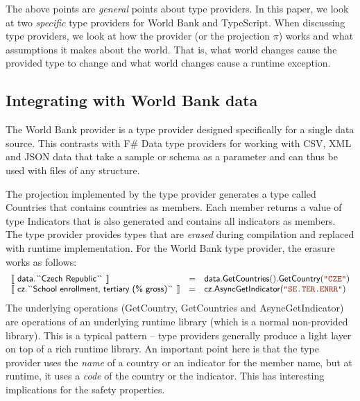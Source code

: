 \documentclass[submission,copyright,creativecommons]{eptcs}
\newcommand{\sem}[1]{\llbracket #1 \rrbracket}
\newcommand{\str}[1]{\textnormal{\textcolor{strclr}{\ttfamily "#1"}}}
\newcommand{\ident}[1]{\textnormal{\sffamily #1}}
\newcommand{\lident}[1]{\textnormal{\sffamily
  \`{}\hspace{-0.25em}\`{}\hspace{-0.1em}#1\`{}\hspace{-0.25em}\`{}}}
\begin{document}
\noindent
The above points are \emph{general} points about type providers. In this paper, we look at two
\emph{specific} type providers for World Bank and TypeScript. When discussing type providers, we
look at how the provider (or the projection $\pi$) works and what assumptions it makes
about the world. That is, what world changes cause the provided type to change and what world
changes cause a runtime exception.


\subsection{Integrating with World Bank data}
\label{sec:tp-data}

The World Bank provider \cite{fsharp-data} is a type provider designed specifically for a single
data source. This contrasts with F\# Data type providers for working with CSV, XML and JSON data
that take a sample or schema as a parameter and can thus be used with files of any structure.

The projection implemented by the type provider generates a type called \ident{Countries} that contains
countries as members. Each member returns a value of type \ident{Indicators} that is
also generated and contains all indicators as members. The type provider provides types that are
\emph{erased} during compilation and replaced with runtime implementation. For the World Bank type
provider, the erasure works as follows:
%
\begin{equation*}
\begin{array}{lcl}
 \sem{~\ident{data.}\lident{Czech Republic}~} &=&
   \ident{data.GetCountries}().\ident{GetCountry}(\str{CZE}) \\
 \sem{~\ident{cz.}\lident{School enrollment, tertiary (\% gross)}~} &=&
   \ident{cz.AsyncGetIndicator}(\str{SE.TER.ENRR})
\end{array}
\end{equation*}
%
The underlying operations (\ident{GetCountry}, \ident{GetCountries} and \ident{AsyncGetIndicator})
are operations of an underlying runtime library (which is a normal non-provided library). This is
a typical pattern -- type providers generally produce a light layer on top of a rich runtime library.
An important point here is that the type provider uses the \emph{name} of a country or an indicator
for the member name, but at runtime, it uses a \emph{code} of the country or the indicator. This has
interesting implications for the safety properties.
\end{document}
